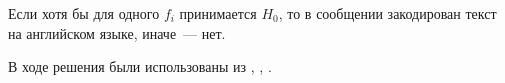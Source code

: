\documentclass[a4paper,10pt]{article}
\begin{document}
Если хотя бы для одного $f_i$ принимается $H_0$, то в сообщении закодирован 
текст на английском языке, иначе~--- нет.

В ходе решения были использованы из \cite{wiki:chi-square}, 
\cite{wiki:pearson},
\cite{chernova2006matstat}.




\pagebreak



\end{document}
